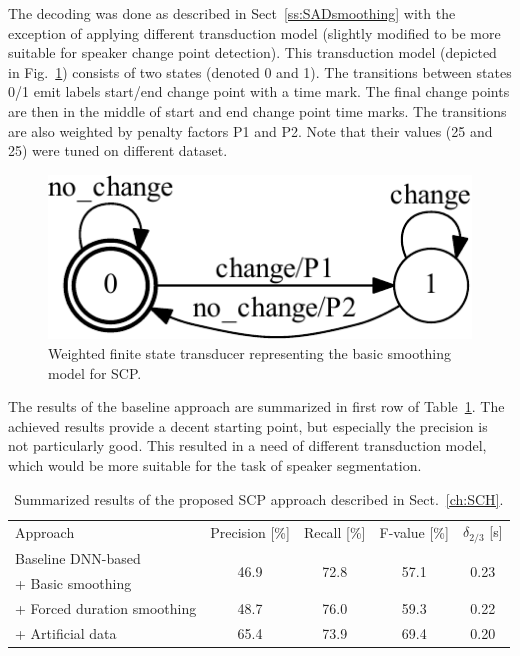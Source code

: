 \documentclass[FM,noheader,EN,bwtitles]{tulthesis}
\begin{document}
The decoding was done as described in Sect~\ref{ss:SADsmoothing} with the exception of applying different transduction model (slightly modified to be more suitable for speaker change point detection).
This transduction model (depicted in Fig.~\ref{fig:SCH1}) consists of two states (denoted 0 and 1).
The transitions between states 0/1 emit labels start/end change point with a time mark.
The final change points are then in the middle of start and end change point time marks.
The transitions are also weighted by penalty factors P1 and P2.
Note that their values (25 and 25) were tuned on different dataset.

\begin{figure}[ht]
\centering
\includegraphics[scale=0.9]{img/SCH1.pdf}
\caption{{Weighted finite state transducer representing the basic smoothing model for SCP.}}
\label{fig:SCH1}
\end{figure}

The results of the baseline approach are summarized in first row of Table~\ref{table:baseSCH}.
The achieved results provide a decent starting point, but especially the precision is not particularly good.
This resulted in a need of different transduction model, which would be more suitable for the task of speaker segmentation.

\begin{table}
\caption{Summarized results of the proposed SCP approach described in Sect.~\ref{ch:SCH}.} \label{table:baseSCH}
\centering
\begin{tabular}{lcccc}
\hline
\noalign{\smallskip}
 Approach & Precision [\%] & Recall [\%] & F-value [\%] & $\delta_{2/3}$ [s] \\
\noalign{\smallskip}
\hline
\noalign{\smallskip}
 Baseline DNN-based & \multirow{2}{*}{46.9} & \multirow{2}{*}{72.8} & \multirow{2}{*}{57.1} & \multirow{2}{*}{0.23} \\
 + Basic smoothing &&&& \\
 + Forced duration smoothing & 48.7 & 76.0 & 59.3 & 0.22 \\
 + Artificial data & 65.4 & 73.9 & 69.4 & 0.20 \\
\hline
\end{tabular}
\end{table}
\end{document}
